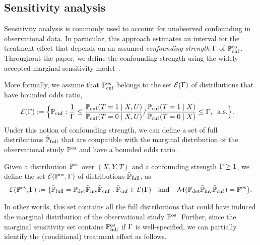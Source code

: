  

\subsection{Sensitivity analysis}
\label{sec:sensana}
Sensitivity analysis is commonly used to account for unobserved confounding in observational data. In particular, this approach estimates an interval for the treatment effect that depends on an assumed
\emph{confounding strength} $\Gamma$ of $\mathbb{P}_{\operatorname{cnf}}^{\operatorname{os}}$. Throughout the paper,  we define the confounding strength using the widely accepted marginal sensitivity model~\citep{tan2006distributional}. 

More formally,
we assume that $\mathbb{P}_{\operatorname{cnf}}^{\operatorname{os}}$ belongs to the set $\mathcal{E}(\Gamma)$ of distributions
that have bounded odds ratio,   
\begin{align*}
	&\mathcal{E}(\Gamma) :=  \Big  \{ \mathbb{P}_{\operatorname{cnf}}: \frac{1}{\Gamma} \leq   \frac{\mathbb{P}_{\operatorname{cnf}}(T=1 \mid X, U)}{\mathbb{P}_{\operatorname{cnf}}(T=0 \mid X, U)} / \frac{\mathbb{P}_{\operatorname{cnf}}(T=1 \mid X)}{\mathbb{P}_{\operatorname{cnf}}(T=0 \mid X)}  \leq \Gamma, \;\; \mathrm{a.s.}   \Big \}.
\end{align*}
Under this notion of confounding strength,  we can define a set of full distributions $\tilde{\mathbb{P}}_{\operatorname{full}}$ that are compatible with the marginal distribution of the observational study $\mathbb{P}^{\operatorname{os}}$ and have a bounded odds ratio. 
 \begin{definition}
\label{def:msm} 
Given a distribution $\mathbb{P}^{\operatorname{os}}$ over $(X,Y,T)$ and a confounding strength $\Gamma \geq 1$, we define the set $\mathcal{E}(\mathbb{P}^{\operatorname{os}}, \Gamma)$ of distributions $\tilde{\mathbb{P}}_{\operatorname{full}}$, as
\begin{align}
\mathcal{E}(\mathbb {\mathbb{P}^{\operatorname{os}}}, \Gamma) :=   
\{ \tilde{\mathbb{P}}_{\operatorname{full}} = \mathbb{P} _{\operatorname{det}} \tilde{\mathbb{P}}_{\operatorname{inv}} \tilde{\mathbb{P}}_{\operatorname{cnf}}: \tilde{\mathbb{P}}_{\operatorname{cnf}} \in \mathcal{E}(\Gamma) 
 \quad \mathrm{and} \quad\mathcal{M}(\mathbb{P} _{\operatorname{det}}\tilde{\mathbb{P}}_{\operatorname{inv}}\tilde{\mathbb{P}}_{\operatorname{cnf}}) = \mathbb{P}^{\operatorname{os}} \nonumber
\}.
\end{align}
 \end{definition}
In other words, this set contains all the full distributions that could have induced the marginal distribution of the observational study $\mathbb{P}^{\operatorname{os}}$.
Further, since the marginal sensitivity set contains $\mathbb{P} ^{\operatorname{os}}_{\operatorname{full}}$ if $\Gamma$ is well-specified, we can partially identify the (conditional) treatment effect as follows. 
